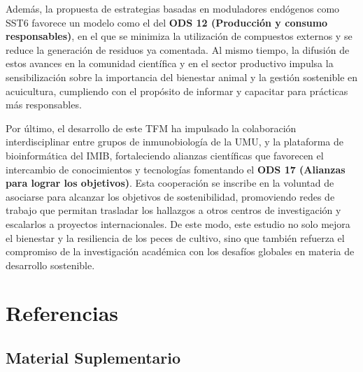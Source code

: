 \documentclass[10pt,a4paper]{article}
\begin{document}
Además, la propuesta de estrategias basadas en moduladores endógenos como SST6 favorece un modelo como el del  \textbf{ODS 12 (Producción y consumo responsables)}, en el que se minimiza la utilización de compuestos externos y se reduce la generación de residuos ya comentada. Al mismo tiempo, la difusión de estos avances en la comunidad científica y en el sector productivo impulsa la sensibilización sobre la importancia del bienestar animal y la gestión sostenible en acuicultura, cumpliendo con el propósito de informar y capacitar para prácticas más responsables.

Por último, el desarrollo de este TFM ha impulsado la colaboración interdisciplinar entre grupos de inmunobiología de la UMU, y la plataforma de bioinformática del IMIB, fortaleciendo alianzas científicas que favorecen el intercambio de conocimientos y tecnologías fomentando el  \textbf{ODS 17 (Alianzas para lograr los objetivos)}. Esta cooperación se inscribe en la voluntad de asociarse para alcanzar los objetivos de sostenibilidad, promoviendo redes de trabajo que permitan trasladar los hallazgos a otros centros de investigación y escalarlos a proyectos internacionales. De este modo, este estudio no solo mejora el bienestar y la resiliencia de los peces de cultivo, sino que también refuerza el compromiso de la investigación académica con los desafíos globales en materia de desarrollo sostenible.
\clearpage  

\section{Referencias}
\printbibliography[heading=none]

\clearpage
\appendix

\begin{center}
\section*{Material Suplementario}
\end{center}

\setcounter{figure}{0}
\renewcommand{\thefigure}{S\arabic{figure}}
\end{document}

